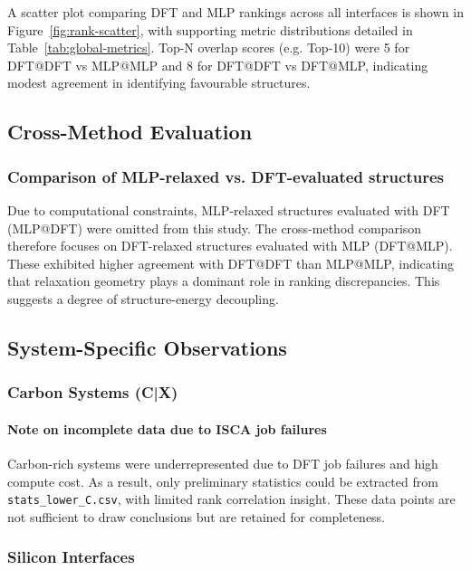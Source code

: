 A scatter plot comparing DFT and MLP rankings across all interfaces is shown in Figure~\ref{fig:rank-scatter}, with supporting metric distributions detailed in Table~\ref{tab:global-metrics}. Top-N overlap scores (e.g. Top-10) were 5 for DFT@DFT vs MLP@MLP and 8 for DFT@DFT vs DFT@MLP, indicating modest agreement in identifying favourable structures.

\subsection{Cross-Method Evaluation}

\subsubsection{Comparison of MLP-relaxed vs. DFT-evaluated structures}

Due to computational constraints, MLP-relaxed structures evaluated with DFT (MLP@DFT) were omitted from this study. The cross-method comparison therefore focuses on DFT-relaxed structures evaluated with MLP (DFT@MLP). These exhibited higher agreement with DFT@DFT than MLP@MLP, indicating that relaxation geometry plays a dominant role in ranking discrepancies. This suggests a degree of structure-energy decoupling.

\subsection{System-Specific Observations}

\subsubsection{Carbon Systems (C|X)}

\paragraph{Note on incomplete data due to ISCA job failures}

Carbon-rich systems were underrepresented due to DFT job failures and high compute cost. As a result, only preliminary statistics could be extracted from \texttt{stats\_lower\_C.csv}, with limited rank correlation insight. These data points are not sufficient to draw conclusions but are retained for completeness.

\subsubsection{Silicon Interfaces}

